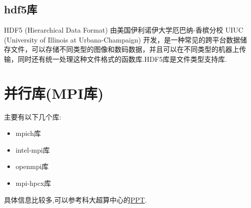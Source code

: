 \subsection{hdf5库}
HDF5 (Hierarchical Data Format) 由美国伊利诺伊大学厄巴纳-香槟分校 UIUC (University of Illinois at Urbana-Champaign) 开发，是一种常见的跨平台数据储存文件，可以存储不同类型的图像和数码数据，并且可以在不同类型的机器上传输，同时还有统一处理这种文件格式的函数库.HDF5库是文件类型支持库.


\section{并行库(MPI库)}

主要有以下几个库:
\begin{itemize}
	\item{mpich库}
	\item{intel-mpi库}
	\item{openmpi库}
	\item{mpi-hpcx库}
\end{itemize}
\par
具体信息比较多,可以参考科大超算中心的\href{https://scc.ustc.edu.cn/zlsc/pxjz/201511/W020160527491539600596.pdf}{PPT}.


